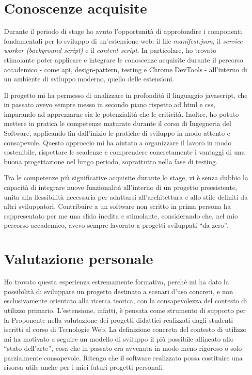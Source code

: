 \section{Conoscenze acquisite}

Durante il periodo di stage ho avuto l’opportunità di approfondire i componenti fondamentali per lo sviluppo di un’estensione web: il file \textit{manifest.json}, il \textit{service worker} \textit{(background script)} e il \textit{content script}. In particolare, ho trovato stimolante poter applicare e integrare le conoscenze acquisite durante il percorso accademico - come \gls{api}, \gls{design-pattern}, testing e Chrome DevTools - all’interno di un ambiente di sviluppo moderno, quello delle estensioni.

\vspace{10pt}
\noindent Il progetto mi ha permesso di analizzare in profondità il linguaggio \gls{javascript}, che in passato avevo sempre messo in secondo piano rispetto ad \gls{html} e \gls{css}, imparando ad apprezzarne sia le potenzialità che le criticità. Inoltre, ho potuto mettere in pratica le competenze maturate durante il corso di Ingegneria del Software, applicando fin dall’inizio le pratiche di sviluppo in modo attento e consapevole. Questo approccio mi ha aiutato a organizzare il lavoro in modo sostenibile, rispettare le scadenze e comprendere concretamente i vantaggi di una buona progettazione nel lungo periodo, soprattutto nella fase di testing.

\vspace{10pt}
\noindent Tra le competenze più significative acquisite durante lo stage, vi è senza dubbio la capacità di integrare nuove funzionalità all’interno di un progetto preesistente, unita alla flessibilità necessaria per adattarsi all’architettura e allo stile definiti da altri sviluppatori. Contribuire a un software non scritto in prima persona ha rappresentato per me una sfida inedita e stimolante, considerando che, nel mio percorso accademico, avevo sempre lavorato a progetti sviluppati “da zero”.

\section{Valutazione personale}

Ho trovato questa esperienza estremamente formativa, perché mi ha dato la possibilità di sviluppare un progetto destinato a scenari d’uso concreti, e non esclusivamente orientato alla ricerca teorica, con la consapevolezza del contesto di utilizzo primario. L’estensione, infatti, è pensata come strumento di supporto per la Proponente nella valutazione dei progetti didattici realizzati dagli studenti iscritti al corso di Tecnologie Web. La definizione concreta del contesto di utilizzo mi ha motivato a seguire un modello di sviluppo il più possibile allineato allo “stato dell’arte”, cosa che in passato era avvenuta in modo meno rigoroso o solo parzialmente consapevole. Ritengo che il software realizzato possa costituire una risorsa utile anche per i miei futuri progetti personali.

